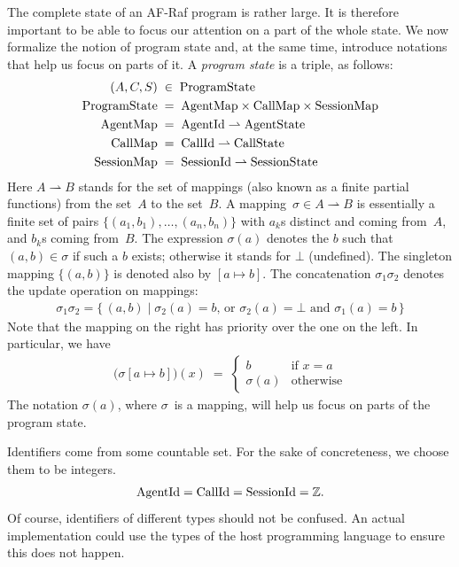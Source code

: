 \documentclass[a4paper,12pt,oneside,fleqn]{book} %
\newcommand{\pmap}{\rightharpoonup}
\begin{document}
The complete state of an AF-Raf program is rather large. It is therefore
important to be able to focus our attention on a part of the whole state.
We now formalize the notion of program state and, at the same time,
introduce notations that help us focus on parts of it. A \emph{program
state} is a triple, as follows:
\begin{align}
(A, C, S) &\;\in\; {\rm ProgramState}
\\
{\rm ProgramState} &\;=\;
  {\rm AgentMap}\times{\rm CallMap}\times{\rm SessionMap}
\\
{\rm AgentMap} &\;=\; {\rm AgentId}\pmap{\rm AgentState}
\\
{\rm CallMap} &\;=\; {\rm CallId}\pmap{\rm CallState}
\\
{\rm SessionMap} &\;=\; {\rm SessionId}\pmap{\rm SessionState}
\end{align}
Here $A\pmap B$ stands for the set of mappings (also known as a finite
partial functions) from the set~$A$ to the set~$B$. A mapping~$\sigma\in
A\pmap B$ is essentially a finite set of pairs
$\{(a_1,b_1),\ldots,(a_n,b_n)\}$ with $a_k$s distinct and coming from~$A$,
and $b_k$s coming from~$B$. The expression $\sigma(a)$ denotes the $b$ such
that $(a,b)\in\sigma$ if such a $b$ exists; otherwise it stands for $\bot$
(undefined). The singleton mapping $\{(a,b)\}$ is denoted also by
$[a\mapsto b]$.  The concatenation $\sigma_1\sigma_2$ denotes the update
operation on mappings:
\begin{align}
\sigma_1\sigma_2 = \{\,(a,b)\mid
  \text{$\sigma_2(a)=b$, or $\sigma_2(a)=\bot$ and $\sigma_1(a)=b$}\,\}
\end{align}
Note that the mapping on the right has priority over the one on the left.
In particular, we have
\begin{align}
\bigl(\sigma[a\mapsto b]\bigr)(x) \;=\;
  \begin{cases}
  b & \text{if $x=a$} \\
  \sigma(a) & \text{otherwise}
  \end{cases}
\end{align}
The notation $\sigma(a)$, where $\sigma$~is a mapping, will help us focus
on parts of the program state.

Identifiers come from some countable set. For the sake of concreteness, we
choose them to be integers.
\begin{align}
{\rm AgentId} = {\rm CallId} = {\rm SessionId} = \mathbb{Z}.
\end{align}
Of course, identifiers of different types should not be confused. An actual
implementation could use the types of the host programming language to
ensure this does not happen.
\end{document}
